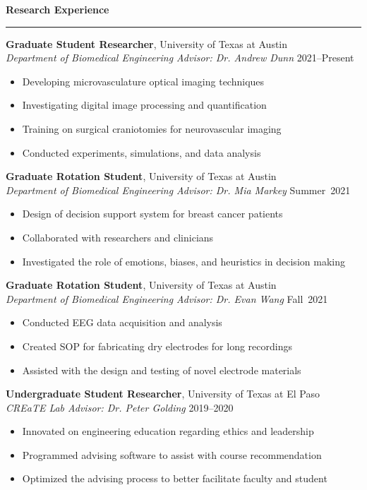 \documentclass[11pt]{article}
\newcommand{\sectionheading}[1]{%
  \vspace{1.6ex}%
  {\large\bfseries #1}\par\vspace{0.4ex}
  \hrule height 0.5pt\vspace{0.8ex}%
}
\begin{document}
\sectionheading{Research Experience}

\textbf{Graduate Student Researcher}, University of Texas at Austin\\
\textit{Department of Biomedical Engineering \quad Advisor: Dr. Andrew Dunn} \hfill 2021--Present
\begin{itemize}
  \item Developing microvasculature optical imaging techniques
  \item Investigating digital image processing and quantification
  \item Training on surgical craniotomies for neurovascular imaging
  \item Conducted experiments, simulations, and data analysis
\end{itemize}

\textbf{Graduate Rotation Student}, University of Texas at Austin\\
\textit{Department of Biomedical Engineering \quad Advisor: Dr. Mia Markey} \hfill Summer~2021
\begin{itemize}
  \item Design of decision support system for breast cancer patients
  \item Collaborated with researchers and clinicians
  \item Investigated the role of emotions, biases, and heuristics in decision making
\end{itemize}

\textbf{Graduate Rotation Student}, University of Texas at Austin\\
\textit{Department of Biomedical Engineering \quad Advisor: Dr. Evan Wang} \hfill Fall~2021
\begin{itemize}
  \item Conducted EEG data acquisition and analysis
  \item Created SOP for fabricating dry electrodes for long recordings
  \item Assisted with the design and testing of novel electrode materials
\end{itemize}

\textbf{Undergraduate Student Researcher}, University of Texas at El Paso\\
\textit{CREaTE Lab \quad Advisor: Dr. Peter Golding} \hfill 2019--2020
\begin{itemize}
  \item Innovated on engineering education regarding ethics and leadership
  \item Programmed advising software to assist with course recommendation
  \item Optimized the advising process to better facilitate faculty and student
\end{itemize}
\end{document}
